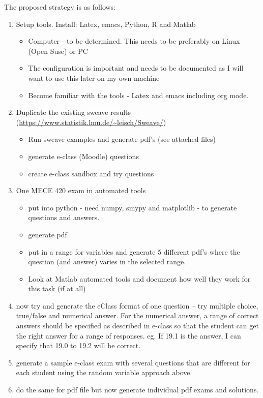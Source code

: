 \documentclass[12pt]{article}
\begin{document}
The proposed strategy is as follows:
\begin{enumerate}
  \item Setup tools. Install: Latex, emacs, Python, R and Matlab
  \begin{itemize}
    \item Computer - to be determined. This needs to be preferably on Linux (Open Suse) or PC
    \item The configuration is important and needs to be documented as I will want to use this later on my own machine
    \item Become familiar with the tools - Latex and emacs including org mode.
  \end{itemize}
  \item Duplicate the existing sweave results (\url{https://www.statistik.lmu.de/~leisch/Sweave/})
  \begin{itemize}
    \item Run sweave examples and generate pdf's (see attached files)
    \item generate e-class (Moodle) questions
    \item create e-class sandbox and try questions
  \end{itemize}
  \item One MECE 420 exam in automated tools
  \begin{itemize}
    \item  put into python - need numpy, smypy and matplotlib - to generate questions and answers.
    \item  generate pdf
    \item  put in a range for variables and generate 5 different pdf's where the question (and answer) varies in the selected range.
    \item Look at Matlab automated tools and document how well they work for this task (if at all)
  \end{itemize}
  \item now try and generate the eClass format of one question -- try multiple choice, true/false and numerical answer. For the numerical answer, a range of correct answers should be specified as described in e-class so that the student can get the right answer for a range of responses. eg. If 19.1 is the answer, I can specify that 19.0 to 19.2 will be correct.
  \item generate a sample e-class exam with several questions that are different for each student using the random variable approach above.
  \item do the same for pdf file but now generate individual pdf exams and solutions.

\end{enumerate}
\end{document}
